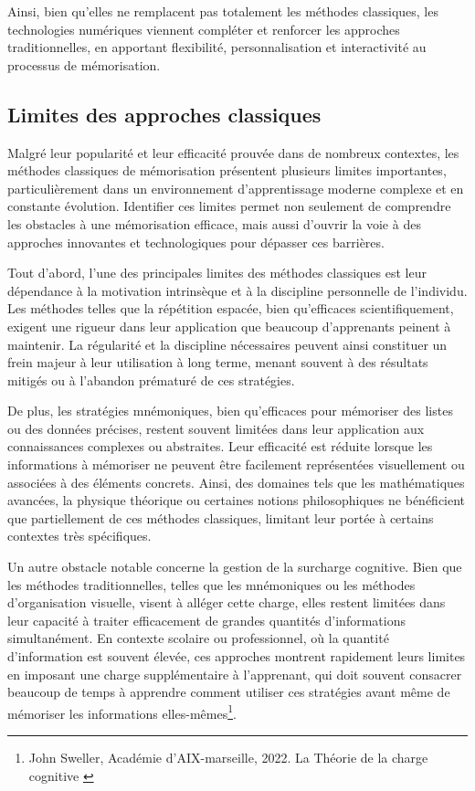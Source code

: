 \documentclass[11pt,a4paper]{report}
\begin{document}
Ainsi, bien qu’elles ne remplacent pas totalement les méthodes classiques, les technologies numériques viennent compléter et renforcer les approches traditionnelles, en apportant flexibilité, personnalisation et interactivité au processus de mémorisation.

\subsection{Limites des approches classiques}

Malgré leur popularité et leur efficacité prouvée dans de nombreux contextes, les méthodes classiques de mémorisation présentent plusieurs limites importantes, particulièrement dans un environnement d’apprentissage moderne complexe et en constante évolution. Identifier ces limites permet non seulement de comprendre les obstacles à une mémorisation efficace, mais aussi d’ouvrir la voie à des approches innovantes et technologiques pour dépasser ces barrières.

Tout d’abord, l’une des principales limites des méthodes classiques est leur dépendance à la motivation intrinsèque et à la discipline personnelle de l’individu. Les méthodes telles que la répétition espacée, bien qu’efficaces scientifiquement, exigent une rigueur dans leur application que beaucoup d’apprenants peinent à maintenir. La régularité et la discipline nécessaires peuvent ainsi constituer un frein majeur à leur utilisation à long terme, menant souvent à des résultats mitigés ou à l’abandon prématuré de ces stratégies.

De plus, les stratégies mnémoniques, bien qu’efficaces pour mémoriser des listes ou des données précises, restent souvent limitées dans leur application aux connaissances complexes ou abstraites. Leur efficacité est réduite lorsque les informations à mémoriser ne peuvent être facilement représentées visuellement ou associées à des éléments concrets. Ainsi, des domaines tels que les mathématiques avancées, la physique théorique ou certaines notions philosophiques ne bénéficient que partiellement de ces méthodes classiques, limitant leur portée à certains contextes très spécifiques.

Un autre obstacle notable concerne la gestion de la surcharge cognitive. Bien que les méthodes traditionnelles, telles que les mnémoniques ou les méthodes d’organisation visuelle, visent à alléger cette charge, elles restent limitées dans leur capacité à traiter efficacement de grandes quantités d'informations simultanément. En contexte scolaire ou professionnel, où la quantité d’information est souvent élevée, ces approches montrent rapidement leurs limites en imposant une charge supplémentaire à l'apprenant, qui doit souvent consacrer beaucoup de temps à apprendre comment utiliser ces stratégies avant même de mémoriser les informations elles-mêmes\footnote{John Sweller, Académie d'AIX-marseille, 2022. La Théorie de la charge cognitive \cite{sweller}}.
\end{document}
